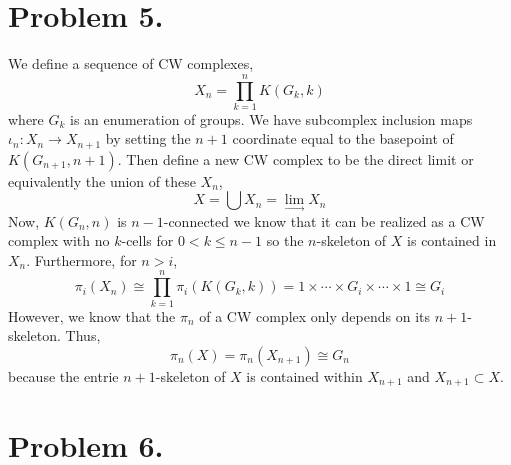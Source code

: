 \documentclass[12pt]{extarticle}
\begin{document}
\section*{Problem 5.}

We define a sequence of CW complexes,
\[X_n = \prod_{k = 1}^n K(G_k, k) \]
where $G_k$ is an enumeration of groups. We have subcomplex inclusion maps $\iota_n : X_n \to X_{n + 1}$ by setting the $n+1$ coordinate equal to the basepoint of $K(G_{n+1}, n + 1)$. Then define a new CW complex to be the direct limit or equivalently the union of these $X_n$,
\[ X = \bigcup X_n = \lim\limits_{\to} X_n \] Now, $K(G_n, n)$ is $n-1$-connected we know that it can be realized as a CW complex with no $k$-cells for $0 < k \le n - 1$ so the $n$-skeleton of $X$ is contained in $X_{n}$. Furthermore, for $n > i$,
\[ \pi_i(X_n) \cong \prod_{k = 1}^n \pi_i(K(G_k, k))   = 1 \times \cdots \times G_i \times \cdots \times 1 \cong G_i\]
However, we know that the $\pi_n$ of a CW complex only depends on its $n+1$-skeleton. Thus,
\[ \pi_n(X) = \pi_n(X_{n+1}) \cong G_n \]
because the entrie $n+1$-skeleton of $X$ is contained within $X_{n+1}$ and $X_{n+1} \subset X$. 

\section*{Problem 6.}
\end{document}
